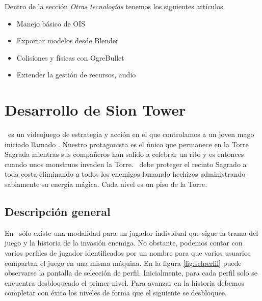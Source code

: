 \documentclass[a4paper,11pt]{article}
\begin{document}
\noindent Dentro de la sección \textit{Otras tecnologías} tenemos los siguientes
artículos.

\begin{itemize}
    \itemsep0em
    \item Manejo básico de OIS
    \item Exportar modelos desde Blender
    \item Colisiones y físicas con OgreBullet
    \item Extender la gestión de recursos, audio
\end{itemize}


\section{Desarrollo de Sion Tower}

\noindent \juego\ es un videojuego de estrategia y acción en el que controlamos a
un joven mago iniciado llamado \prota. Nuestro protagonista es el
único que permanece en la Torre Sagrada mientras sus compañeros han salido
a celebrar un rito y es entonces cuando unos monstruos invaden la Torre.
\prota\ debe proteger el recinto Sagrado a toda costa eliminando
a todos los enemigos lanzando hechizos administrando sabiamente su energía
mágica. Cada nivel es un piso de la Torre.\\

\subsection{Descripción general}


\noindent En \juego\ sólo existe una modalidad para un jugador individual
que sigue la trama del juego y la historia de la invasión enemiga. No obstante,
podemos contar con varios perfiles de jugador identificados por un nombre
para que varios usuarios compartan el juego en una misma máquina. En la
figura \ref{fig:selperfil} puede observarse la pantalla de selección de perfil.
Inicialmente, para cada perfil solo se encuentra desbloqueado el primer nivel.
Para avanzar en la historia debemos completar con éxito los niveles de
forma que el siguiente se desbloquee.\\\\
\end{document}
